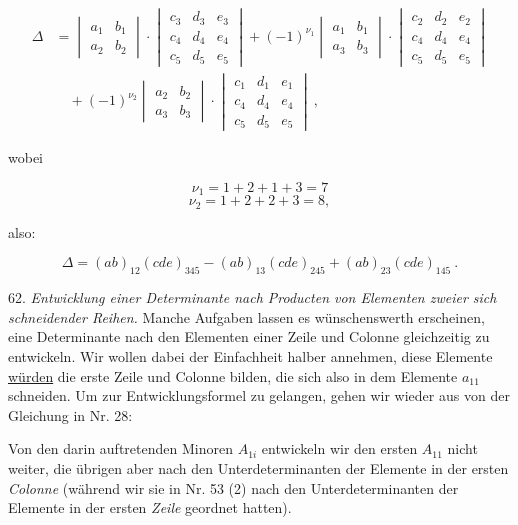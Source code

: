 \[
\begin{aligned}
\Delta &= \begin{vmatrix} a_1 & b_1 \\ a_2 & b_2 \end{vmatrix} \cdot
\begin{vmatrix} c_3 & d_3 & e_3 \\ c_4 & d_4 & e_4 \\ c_5 & d_5 & e_5 \end{vmatrix}
+ (-1)^{\nu_1} \begin{vmatrix} a_1 & b_1 \\ a_3 & b_3 \end{vmatrix} \cdot
\begin{vmatrix} c_2 & d_2 & e_2 \\ c_4 & d_4 & e_4 \\ c_5 & d_5 & e_5 \end{vmatrix}\\
&\quad + (-1)^{\nu_2} \begin{vmatrix} a_2 & b_2 \\ a_3 & b_3 \end{vmatrix} \cdot
\begin{vmatrix} c_1 & d_1 & e_1 \\ c_4 & d_4 & e_4 \\ c_5 & d_5 & e_5 \end{vmatrix}\ ,
\end{aligned}
\]

wobei

\[
\nu_1 = 1 + 2 + 1 + 3 = 7
\]
\[
\nu_2 = 1 + 2 + 2 + 3 = 8,
\]

also:

\[
\Delta = (ab)_{12}(cde)_{345} - (ab)_{13}(cde)_{245} + (ab)_{23}(cde)_{145}\ .
\]

62. \textit{Entwicklung einer Determinante nach Producten von Elementen zweier sich
schneidender Reihen.} Manche Aufgaben lassen es w\"unschenswerth erscheinen, eine
Determinante nach den Elementen einer Zeile und Colonne gleichzeitig zu entwickeln. Wir
wollen dabei der Einfachheit halber annehmen, diese Elemente \underline{w\"urden} %
die erste Zeile und Colonne bilden, die sich also in dem Elemente $a_{11}$ schneiden. Um zur
Entwicklungsformel zu gelangen, gehen wir wieder aus von der Gleichung in Nr. 28:


Von den darin auftretenden Minoren $A_{1i}$ entwickeln wir den ersten $A_{11}$ nicht weiter,
die \"ubrigen aber nach den Unterdeterminanten der Elemente in der ersten \textit{Colonne}
(w\"ahrend wir sie in Nr. 53 (2) nach den Unterdeterminanten der Elemente in der ersten
\textit{Zeile} geordnet hatten).

